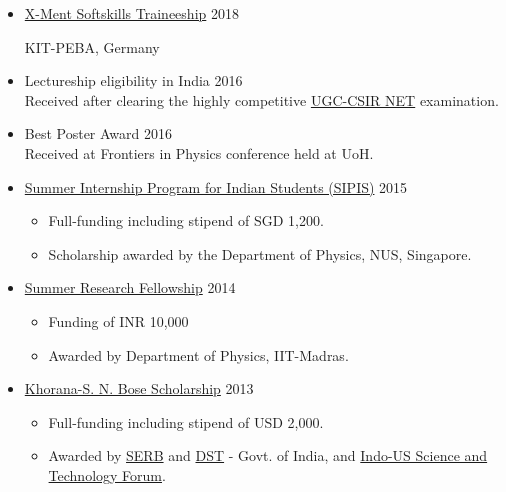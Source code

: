 \begin{itemize}[noitemsep]
\item \href{https://www.peba.kit.edu/1009.php}{X-Ment Softskills Traineeship} \hfill 2018 \par
KIT-PEBA, Germany

\item {{Lectureship eligibility in India}} \hfill 2016 \\
Received after clearing the highly competitive \href{http://www.csirhrdg.res.in/mcs_netexam_notice.htm}{UGC-CSIR NET} examination.

\item {{Best Poster Award}} \hfill 2016\\
Received at Frontiers in Physics conference held at UoH.



\item {\color{blue} \href{http://www.physics.nus.edu.sg/student/pros_grad_SIPIS.html}{Summer Internship Program for Indian Students (SIPIS)}} \hfill 2015
\begin{itemize}[noitemsep]
\item Full-funding including stipend of SGD 1,200.
\item Scholarship awarded by the Department of Physics, NUS, Singapore. 
\end{itemize}

\item {\color{blue} \href{https://sfp.iitm.ac.in/}{Summer Research Fellowship}} \hfill 2014
\begin{itemize}[noitemsep]
\item Funding of INR 10,000
\item Awarded by Department of Physics, IIT-Madras.
\end{itemize} 

\item {\color{blue} \href{http://iusstf.org/story/53-74-For-Indian-Students.html}{Khorana-S. N. Bose Scholarship}} \hfill 2013
\begin{itemize}[noitemsep]
	\item Full-funding including stipend of USD 2,000.
	\item Awarded by \href{http://www.serb.gov.in}{SERB} and \href{http://www.dst.gov.in}{DST} - Govt. of India, and \href{www.iusstf.org}{Indo-US Science and Technology Forum}.
\end{itemize}

\end{itemize}
\vspace{-0.4cm}